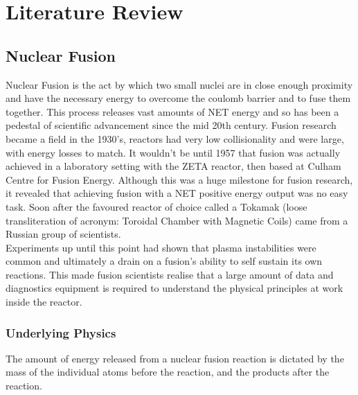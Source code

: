 \documentclass[12pt,a4paper,oneside]{report}
\begin{document}

\chapter{Literature Review}
	\section{Nuclear Fusion}
Nuclear Fusion is the act by which two small nuclei are in close enough proximity and have the necessary energy to overcome the coulomb barrier and to fuse them together. This process releases vast amounts of NET energy and so has been a pedestal of scientific advancement since the mid 20th century. Fusion research became a field in the 1930's, reactors had very low collisionality and were large, with energy losses to match. It wouldn't be until 1957 that fusion was actually achieved in a laboratory setting with the ZETA reactor, then based at Culham Centre for Fusion Energy. Although this was a huge milestone for fusion research, it revealed that achieving fusion with a NET positive energy output was no easy task. Soon after the favoured reactor of choice called a Tokamak (loose transliteration of acronym: Toroidal Chamber with Magnetic Coils) came from a Russian group of scientists.
\\
Experiments up until this point had shown that plasma instabilities were common and ultimately a drain on a fusion's ability to self sustain its own reactions. This made fusion scientists realise that a large amount of data and diagnostics equipment is required to understand the physical principles at work inside the reactor.
\pagebreak
	\subsection{Underlying Physics}
The amount of energy released from a nuclear fusion reaction is dictated by the mass of the individual atoms before the reaction, and the products after the reaction. \linebreak
\end{document}
